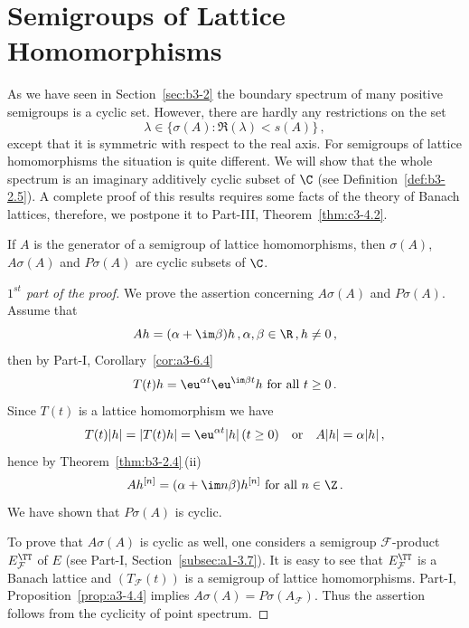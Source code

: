 \section{Semigroups of Lattice Homomorphisms}\label{sec:b3-4}%
As we have seen in Section~\ref{sec:b3-2} the boundary spectrum of many positive semigroups is a cyclic set.
However, there are hardly any restrictions on the set 
\[
\lambda \in \{ \sigma(A) \colon \Re(\lambda) < s(A)\}\,,
\] 
except that it is symmetric with respect to the real axis.
For semigroups of lattice homomorphisms the situation is quite different.
We will show that the whole spectrum is an imaginary additively cyclic 
subset of\/ $\C$ (see Definition~\ref{def:b3-2.5}).
A complete proof of this results requires some facts of the theory of Banach lattices, therefore, we postpone it to Part-III, Theorem~\ref{thm:c3-4.2}.
\begin{theorem}\label{thm:b3-4.1}
If\/ $A$ is the generator of a semigroup of lattice homomorphisms, then $\sigma(A)$, $A\sigma(A)$ and $P\sigma(A)$ are cyclic subsets of\/ $\C$.
\end{theorem}
\begin{proof}[$1^{st}$ part of the proof]
We prove the assertion concerning $A\sigma(A)$ and $P\sigma(A)$.
	Assume that 
    \[
    Ah = (\alpha + \im\beta)h\,, \alpha,\beta \in \R\,, h \neq 0\,,
    \]
    then by Part-I, Corollary~\ref{cor:a3-6.4}
    \[
    T(t)h = \eu^{\alpha t}\eu^{\im\beta  t}h \text{ for all } t \geq 0\,.
    \]
	Since $T(t)$ is a lattice homomorphism we have 
    \[
    T(t)|h| = |T(t)h| = \eu^{\alpha t}|h|\, (t \geq 0)
    \quad\text{or}\quad A|h| = \alpha|h|\,,
    \] 
    hence by Theorem~\ref{thm:b3-2.4}\,(ii)
    \[
    Ah^{[n]} = (\alpha + \im n\beta)h^{[n]} \text{ for all } n \in \Z\,.
    \]
	We have shown that $P\sigma(A)$ is cyclic.
	
	To prove that $A\sigma(A)$ is cyclic as well, one considers a semigroup $\mathcal{F}$-product $E_{\mathcal{F}}^{\TT}$ of\/ $E$ 
	(see Part-I, Section~\ref{subsec:a1-3.7}).
	It is easy to see that $E_{\mathcal{F}}^{\TT}$ is a Banach lattice 
	and $(T_{\mathcal{F}}(t))$ is a semigroup of lattice homomorphisms.
	Part-I, Proposition~\ref{prop:a3-4.4} implies $A\sigma(A) = P\sigma(A_{\mathcal{F}})$.
	Thus the assertion follows from the cyclicity of point spectrum.
\end{proof}
